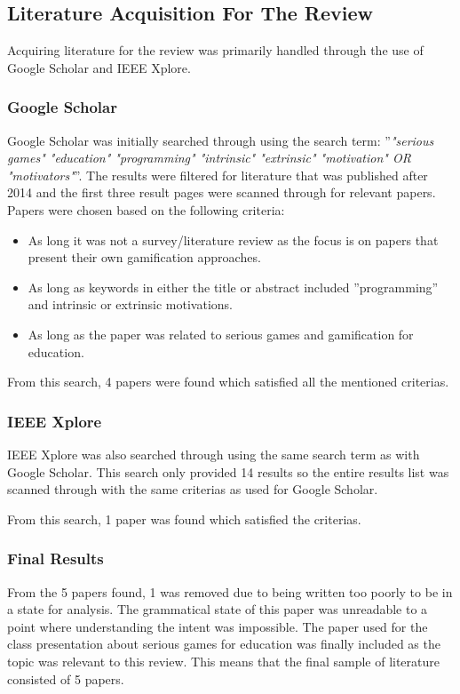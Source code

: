 \subsection{Literature Acquisition For The Review}
Acquiring literature for the review was primarily handled through the use of Google Scholar and IEEE Xplore.

\subsubsection{Google Scholar}
Google Scholar was initially searched through using the search term: ''\emph{"serious games" "education" "programming" "intrinsic" "extrinsic" "motivation" OR "motivators"}''. The results were filtered for literature that was published after 2014 and the first three result pages were scanned through for relevant papers. Papers were chosen based on the following criteria: 

\begin{itemize}
    \item As long it was not a survey/literature review as the focus is on papers that present their own gamification approaches.  
    \item As long as keywords in either the title or abstract included ''programming'' and intrinsic or extrinsic motivations. 
    \item As long as the paper was related to serious games and gamification for education. 
\end{itemize}

From this search, 4 papers were found which satisfied all the mentioned criterias. 

\subsubsection{IEEE Xplore}
IEEE Xplore was also searched through using the same search term as with Google Scholar. This search only provided 14 results so the entire results list was scanned through with the same criterias as used for Google Scholar. 

From this search, 1 paper was found which satisfied the criterias. 

\subsubsection{Final Results} 
From the 5 papers found, 1 was removed due to being written too poorly to be in a state for analysis. The grammatical state of this paper was unreadable to a point where understanding the intent was impossible. The paper used for the class presentation about serious games for education was finally included as the topic was relevant to this review. This means that the final sample of literature consisted of 5 papers. 
